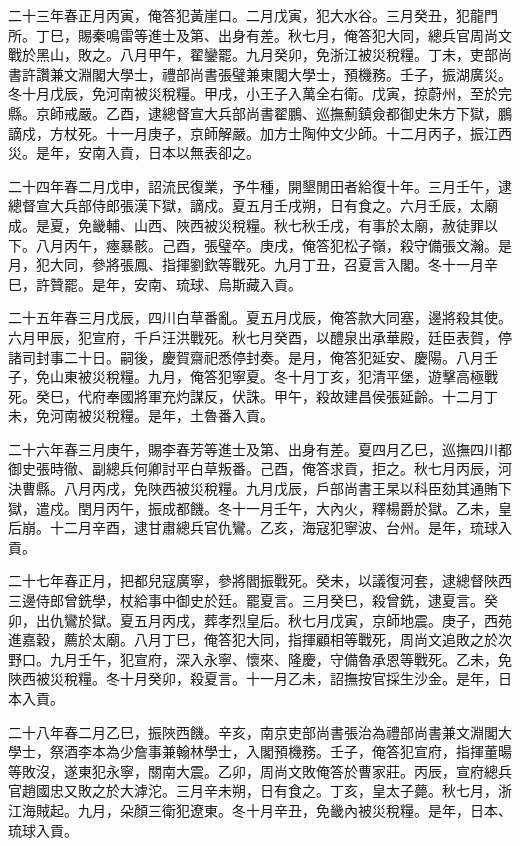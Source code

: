 \begin{pinyinscope}
二十三年春正月丙寅，俺答犯黃崖口。二月戊寅，犯大水谷。三月癸丑，犯龍門所。丁巳，賜秦鳴雷等進士及第、出身有差。秋七月，俺答犯大同，總兵官周尚文戰於黑山，敗之。八月甲午，翟鑾罷。九月癸卯，免浙江被災稅糧。丁未，吏部尚書許讚兼文淵閣大學士，禮部尚書張璧兼東閣大學士，預機務。壬子，振湖廣災。冬十月戊辰，免河南被災稅糧。甲戌，小王子入萬全右衛。戊寅，掠蔚州，至於完縣。京師戒嚴。乙酉，逮總督宣大兵部尚書翟鵬、巡撫薊鎮僉都御史朱方下獄，鵬謫戍，方杖死。十一月庚子，京師解嚴。加方士陶仲文少師。十二月丙子，振江西災。是年，安南入貢，日本以無表卻之。

二十四年春二月戊申，詔流民復業，予牛種，開墾閒田者給復十年。三月壬午，逮總督宣大兵部侍郎張漢下獄，謫戍。夏五月壬戌朔，日有食之。六月壬辰，太廟成。是夏，免畿輔、山西、陜西被災稅糧。秋七秋壬戌，有事於太廟，赦徒罪以下。八月丙午，瘞暴骸。己酉，張璧卒。庚戌，俺答犯松子嶺，殺守備張文瀚。是月，犯大同，參將張鳳、指揮劉欽等戰死。九月丁丑，召夏言入閣。冬十一月辛巳，許贊罷。是年，安南、琉球、烏斯藏入貢。

二十五年春三月戊辰，四川白草番亂。夏五月戊辰，俺答款大同塞，邊將殺其使。六月甲辰，犯宣府，千戶汪洪戰死。秋七月癸酉，以醴泉出承華殿，廷臣表賀，停諸司封事二十日。嗣後，慶賀齋祀悉停封奏。是月，俺答犯延安、慶陽。八月壬子，免山東被災稅糧。九月，俺答犯寧夏。冬十月丁亥，犯清平堡，遊擊高極戰死。癸巳，代府奉國將軍充灼謀反，伏誅。甲午，殺故建昌侯張延齡。十二月丁未，免河南被災稅糧。是年，土魯番入貢。

二十六年春三月庚午，賜李春芳等進士及第、出身有差。夏四月乙巳，巡撫四川都御史張時徹、副總兵何卿討平白草叛番。己酉，俺答求貢，拒之。秋七月丙辰，河決曹縣。八月丙戌，免陜西被災稅糧。九月戊辰，戶部尚書王杲以科臣劾其通賄下獄，遣戍。閏月丙午，振成都饑。冬十一月壬午，大內火，釋楊爵於獄。乙未，皇后崩。十二月辛酉，逮甘肅總兵官仇鸞。乙亥，海寇犯寧波、台州。是年，琉球入貢。

二十七年春正月，把都兒寇廣寧，參將閻振戰死。癸未，以議復河套，逮總督陜西三邊侍郎曾銑學，杖給事中御史於廷。罷夏言。三月癸巳，殺曾銑，逮夏言。癸卯，出仇鸞於獄。夏五月丙戌，葬孝烈皇后。秋七月戊寅，京師地震。庚子，西苑進嘉穀，薦於太廟。八月丁巳，俺答犯大同，指揮顧相等戰死，周尚文追敗之於次野口。九月壬午，犯宣府，深入永寧、懷來、隆慶，守備魯承恩等戰死。乙未，免陜西被災稅糧。冬十月癸卯，殺夏言。十一月乙未，詔撫按官採生沙金。是年，日本入貢。

二十八年春二月乙巳，振陜西饑。辛亥，南京吏部尚書張治為禮部尚書兼文淵閣大學士，祭酒李本為少詹事兼翰林學士，入閣預機務。壬子，俺答犯宣府，指揮董暘等敗沒，遂東犯永寧，關南大震。乙卯，周尚文敗俺答於曹家莊。丙辰，宣府總兵官趙國忠又敗之於大滹沱。三月辛未朔，日有食之。丁亥，皇太子薨。秋七月，浙江海賊起。九月，朵顏三衛犯遼東。冬十月辛丑，免畿內被災稅糧。是年，日本、琉球入貢。


\end{pinyinscope}
